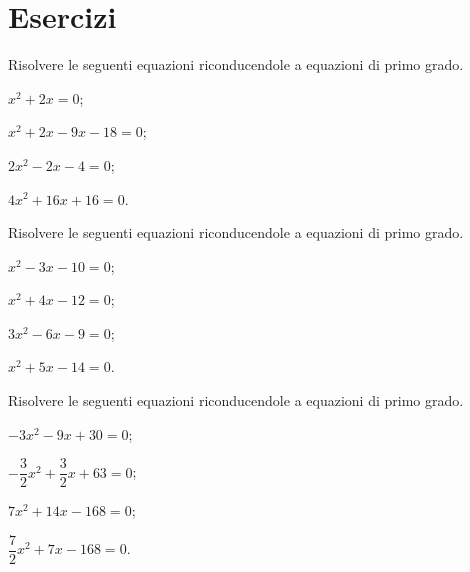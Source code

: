 
\section{Esercizi}



\begin{esercizio}[\Ast]
\label{ese:17.1}
Risolvere le seguenti equazioni riconducendole a equazioni di primo grado.
\begin{multicols}{2}
\begin{enumeratea}
 \item $x^{2}+2x=0$;
 \item $x^{2}+2x-9x-18=0$;
 \item $2x^{2}-2x-4=0$;
 \item $4x^{2}+16x+16=0$.
\end{enumeratea}
\end{multicols}
\end{esercizio}

\begin{esercizio}[\Ast]
\label{ese:17.2}
Risolvere le seguenti equazioni riconducendole a equazioni di primo grado.
\begin{multicols}{2}
\begin{enumeratea}
 \item $x^{2}-3x-10=0$;
 \item $x^{2}+4x-12=0$;
 \item $3x^{2}-6x-9=0$;
 \item $x^{2}+5x-14=0$.
\end{enumeratea}
\end{multicols}
\end{esercizio}

\begin{esercizio}[\Ast]
\label{ese:17.3}
Risolvere le seguenti equazioni riconducendole a equazioni di primo grado.
\begin{multicols}{2}
\begin{enumeratea}
 \item $-3x^{2}-9x+30=0$;
 \item $-{\dfrac{3}{2}}x^{2}+\dfrac{3}{2}x+63=0$;
 \item $7x^{2}+14x-168=0$;
 \item $\dfrac{7}{2}x^{2}+7x-168=0$.
\end{enumeratea}
\end{multicols}
\end{esercizio}

